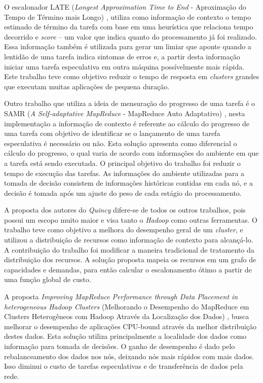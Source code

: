 O escalonador LATE (\textit{Longest Approximation Time to End} - Aproximação do Tempo de Término mais Longo) \cite{LATE}, utiliza como informação de contexto o tempo estimado de término da tarefa com base em uma heurística que relaciona tempo decorrido e \textit{score} -- um valor que indica quanto do processamento já foi realizado. Essa informação também é utilizada para gerar um limiar que aponte quando a lentidão de uma tarefa indica sintomas de erros e, a partir desta informação iniciar uma tarefa especulativa em outra máquina possívelmente mais rápida. Este trabalho teve como objetivo reduzir o tempo de resposta em \textit{clusters} grandes que executam muitas aplicações de pequena duração.

Outro trabalho que utiliza a ideia de mensuração do progresso de uma tarefa é o SAMR (\textit{A Self-adaptative MapReduce} - MapReduce Auto Adaptativo) \cite{SAMR}, nesta implementação a informação de contexto é referente ao cálculo do progresso de uma tarefa com objetivo de identificar se o lançamento de uma tarefa especulativa é necessário ou não. Esta solução apresenta como diferencial o cálculo do progresso, o qual varia de acordo com informações do ambiente em que a tarefa está sendo executada. O principal objetivo do trabalho foi reduzir o tempo de execução das tarefas. As informações do ambiente utilizadas para a tomada de decisão consistem de informações históricas contidas em cada nó, e a decisão é tomada após um ajuste do peso de cada estágio do processamento.


A proposta dos autores do \textit{Quincy} \cite{Quincy} difere-se de todos os outros trabalhos, pois possui um escopo muito maior e visa tanto o \textit{Hadoop} como outras ferramentas. O trabalho teve como objetivo a melhora do desempenho geral de um \textit{cluster}, e utilizou a distribuição de recursos como informação de contexto para alcançá-lo. A contribuição do trabalho foi modificar a maneira tradicional de tratamento da distribuição dos recursos. A solução proposta mapeia os recursos em um grafo de capacidades e demandas, para então calcular o escalonamento ótimo a partir de uma função global de custo.

A proposta \textit{Improving MapReduce Performance through Data Placement in heterogeneous Hadoop Clusters} (Melhorando o Desempenho do MapReduce em Clusters Heterogêneos com Hadoop Através da Localização dos Dados) \cite{IMRPDPHHC}, busca melhorar o desempenho de aplicações CPU-bound através da melhor distribuição destes dados. Esta solução utiliza principalmente a localidade dos dados como informação para tomada de decisões. O ganho de desempenho é dado pelo rebalanceamento dos dados nos nós, deixando nós mais rápidos com mais dados. Isso diminui o custo de tarefas especulativas e de transferência de dados pela rede.

